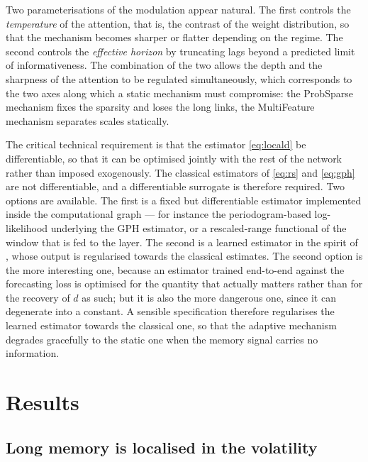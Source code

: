 \documentclass[journal]{IEEEtran}
\begin{document}
Two parameterisations of the modulation appear natural. The first controls the \emph{temperature}
of the attention, that is, the contrast of the weight distribution, so that the mechanism becomes
sharper or flatter depending on the regime. The second controls the \emph{effective horizon} by
truncating lags beyond a predicted limit of informativeness. The combination of the two allows
the depth and the sharpness of the attention to be regulated simultaneously, which corresponds to
the two axes along which a static mechanism must compromise: the ProbSparse mechanism fixes the
sparsity and loses the long links, the MultiFeature mechanism separates scales statically.

The critical technical requirement is that the estimator \eqref{eq:locald} be differentiable, so
that it can be optimised jointly with the rest of the network rather than imposed exogenously. The
classical estimators of \eqref{eq:rs} and \eqref{eq:gph} are not differentiable, and a
differentiable surrogate is therefore required. Two options are available. The first is a fixed
but differentiable estimator implemented inside the computational graph --- for instance the
periodogram-based log-likelihood underlying the GPH estimator, or a rescaled-range functional of
the window that is fed to the layer. The second is a learned estimator in the spirit of
\cite{makarava2025differentiable,csanady2024parameter,boros2024deep}, whose output is regularised
towards the classical estimates. The second option is the more interesting one, because an
estimator trained end-to-end against the forecasting loss is optimised for the quantity that
actually matters rather than for the recovery of $d$ as such; but it is also the more dangerous
one, since it can degenerate into a constant. A sensible specification therefore regularises the
learned estimator towards the classical one, so that the adaptive mechanism degrades gracefully
to the static one when the memory signal carries no information.

\section{Results}\label{sec:results}

\subsection{Long memory is localised in the volatility}
\end{document}
